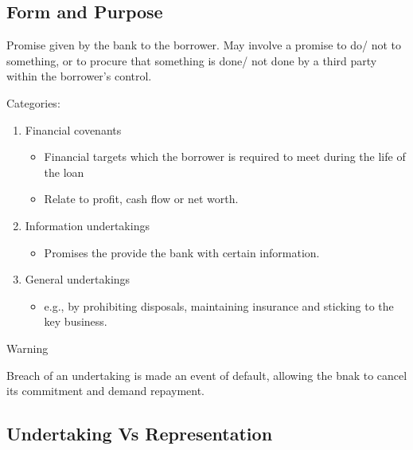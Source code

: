 \documentclass[
]{article}
\providecommand{\tightlist}{%
  \setlength{\itemsep}{0pt}\setlength{\parskip}{0pt}}
\newenvironment{env-9a8b2d5a-e80b-4017-bd60-2afb8ee62329}
{
    \savenotes\tcolorbox[blanker,breakable,left=5pt,borderline west={2pt}{-4pt}{orange}]
}
{
    \endtcolorbox\spewnotes
}
\begin{document}
\hypertarget{form-and-purpose}{%
\subsection{Form and Purpose}\label{form-and-purpose}}

Promise given by the bank to the borrower. May involve a promise to do/
not to something, or to procure that something is done/ not done by a
third party within the borrower's control.

Categories:

\begin{enumerate}
\tightlist
\item
  Financial covenants

  \begin{itemize}
  \tightlist
  \item
    Financial targets which the borrower is required to meet during the
    life of the loan
  \item
    Relate to profit, cash flow or net worth.
  \end{itemize}
\item
  Information undertakings

  \begin{itemize}
  \tightlist
  \item
    Promises the provide the bank with certain information.
  \end{itemize}
\item
  General undertakings

  \begin{itemize}
  \tightlist
  \item
    e.g., by prohibiting disposals, maintaining insurance and sticking
    to the key business.
  \end{itemize}
\end{enumerate}

\begin{env-9a8b2d5a-e80b-4017-bd60-2afb8ee62329}

Warning

Breach of an undertaking is made an event of default, allowing the bnak
to cancel its commitment and demand repayment.

\end{env-9a8b2d5a-e80b-4017-bd60-2afb8ee62329}

\hypertarget{undertaking-vs-representation}{%
\subsection{Undertaking Vs
Representation}\label{undertaking-vs-representation}}
\end{document}
